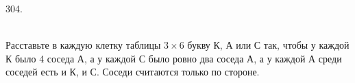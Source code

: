 304. \begin{figure}[ht!]
\end{figure}\\
Расставьте в каждую клетку таблицы $3\times6$ букву К, А или С так, чтобы у каждой К было 4 соседа А, а у каждой С было ровно два соседа А, а у каждой А среди соседей есть и К, и С. Соседи считаются только по стороне.\\
